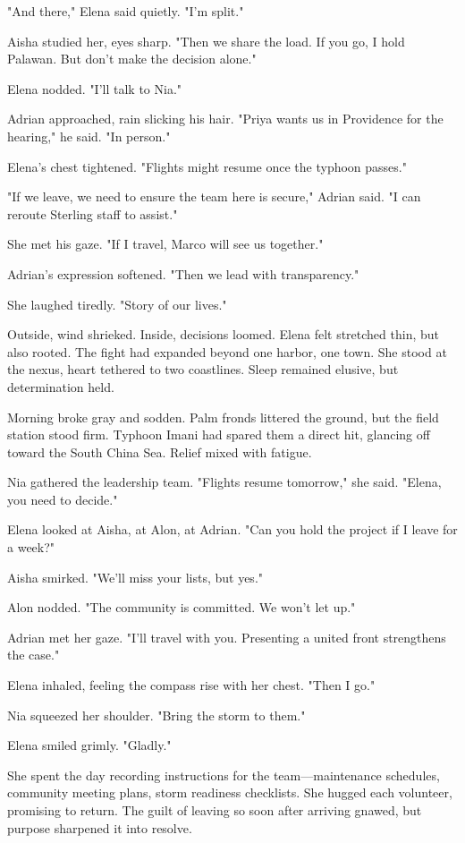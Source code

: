 "And there," Elena said quietly. "I'm split."

Aisha studied her, eyes sharp. "Then we share the load. If you go, I hold Palawan. But don't make the decision alone."

Elena nodded. "I'll talk to Nia."

Adrian approached, rain slicking his hair. "Priya wants us in Providence for the hearing," he said. "In person."

Elena's chest tightened. "Flights might resume once the typhoon passes."

"If we leave, we need to ensure the team here is secure," Adrian said. "I can reroute Sterling staff to assist."

She met his gaze. "If I travel, Marco will see us together."

Adrian's expression softened. "Then we lead with transparency."

She laughed tiredly. "Story of our lives."

Outside, wind shrieked. Inside, decisions loomed. Elena felt stretched thin, but also rooted. The fight had expanded beyond one harbor, one town. She stood at the nexus, heart tethered to two coastlines. Sleep remained elusive, but determination held.

\bigskip

Morning broke gray and sodden. Palm fronds littered the ground, but the field station stood firm. Typhoon Imani had spared them a direct hit, glancing off toward the South China Sea. Relief mixed with fatigue.

Nia gathered the leadership team. "Flights resume tomorrow," she said. "Elena, you need to decide."

Elena looked at Aisha, at Alon, at Adrian. "Can you hold the project if I leave for a week?"

Aisha smirked. "We'll miss your lists, but yes."

Alon nodded. "The community is committed. We won't let up."

Adrian met her gaze. "I'll travel with you. Presenting a united front strengthens the case."

Elena inhaled, feeling the compass rise with her chest. "Then I go."

Nia squeezed her shoulder. "Bring the storm to them."

Elena smiled grimly. "Gladly."

She spent the day recording instructions for the team—maintenance schedules, community meeting plans, storm readiness checklists. She hugged each volunteer, promising to return. The guilt of leaving so soon after arriving gnawed, but purpose sharpened it into resolve.

